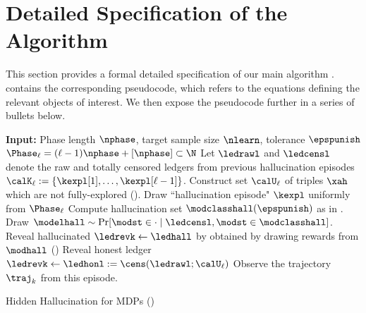 
\section{Detailed Specification of the Algorithm}
\label{app:detailed-spec}

This section provides a formal detailed specification of our main algorithm .  contains the corresponding pseudocode, which refers to the equations defining the relevant objects of interest. We then expose the pseudocode further in a series of bullets below. 
\begin{algorithm}[h]
  	\begin{algorithmic}[1]
  	\State{}\textbf{Input: } Phase length $\nphase$, target sample size $\nlearn$, tolerance $\epspunish$
    \Statex{}
    \State{}$\Phase_{\ell} = (\ell-1) \nphase  + [\nphase] \subset \N$
    \State{}Let $\ledrawl$ and $\ledcensl$ denote the raw and totally censored ledgers
    \Statex{}\qquad\qquad from previous hallucination episodes $\calK_{\ell} := \{ \kexpl[1],\dots,\kexpl[\ell-1]\}$.
    \State{}Construct set $\calU_{\ell}$ of {triples $\xah$ which are not fully-explored} %
     ().
    \State{}Draw ``hallucination episode" $\kexpl$ uniformly from $\Phase_{\ell}$
     \State{}Compute hallucination set $\modclasshall(\epspunish)$ as in .
     \State{}Draw $\modelhall\sim \Pr[\modst \in \cdot \mid \ledcensl, \modst \in \modclasshall]$. 
    \State{}Reveal hallucinated $\ledrevk  \gets \ledhall$ by obtained by drawing rewards
    \Statex{}\qquad\qquad\qquad from $\modhall$ ()
    \Else{} 
     \State{}Reveal honest ledger $\ledrevk \gets \ledhonl := \cens(\ledrawl;\calU_{\ell})$
    \EndIf
    \State{}Observe the trajectory $\traj_k$ from this episode.
    \EndFor
    \EndFor
  \end{algorithmic}
  \caption{Hidden Hallucination for MDPs (\mdphh)}
  \label{alg:MDP_HH_app}
	\end{algorithm}


